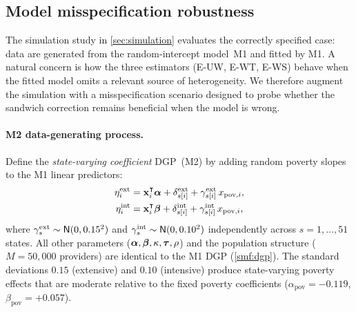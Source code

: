 
\subsection{Model misspecification robustness}
\label{smf:misspec}

The simulation study in \cref{sec:simulation} evaluates the
correctly specified case: data are generated from the random-intercept
model~M1 and fitted by M1.  A natural concern is how the three
estimators (E-UW, E-WT, E-WS) behave when the fitted model omits a
relevant source of heterogeneity.  We therefore augment the simulation
with a misspecification scenario designed to probe whether the sandwich
correction remains beneficial when the model is wrong.

\paragraph{M2 data-generating process.}
Define the \emph{state-varying coefficient} DGP~(M2) by
adding random poverty slopes to the M1 linear predictors:
\begin{align}
  \eta^{\mathrm{ext}}_i &= \mathbf{x}_i^\intercal \boldsymbol{\alpha} + \delta^{\mathrm{ext}}_{s[i]}
    + \gamma^{\mathrm{ext}}_{s[i]} \, x_{\mathrm{pov},i}, \label{eq:m2-ext}\\
  \eta^{\mathrm{int}}_i &= \mathbf{x}_i^\intercal \boldsymbol{\beta}  + \delta^{\mathrm{int}}_{s[i]}
    + \gamma^{\mathrm{int}}_{s[i]} \, x_{\mathrm{pov},i}, \label{eq:m2-int}
\end{align}
where $\gamma^{\mathrm{ext}}_s \sim \textsf{N}(0, 0.15^2)$ and
$\gamma^{\mathrm{int}}_s \sim \textsf{N}(0, 0.10^2)$ independently across
$s = 1,\ldots,51$ states.  All other parameters
($\boldsymbol{\alpha}, \boldsymbol{\beta}, \kappa, \boldsymbol{\tau}, \rho$) and the population structure
($M = 50{,}000$ providers) are identical to the M1 DGP
(\cref{smf:dgp}).  The standard deviations $0.15$ (extensive) and
$0.10$ (intensive) produce state-varying poverty effects that are
moderate relative to the fixed poverty coefficients
($\alpha_{\mathrm{pov}} = -0.119$, $\beta_{\mathrm{pov}} = +0.057$).

